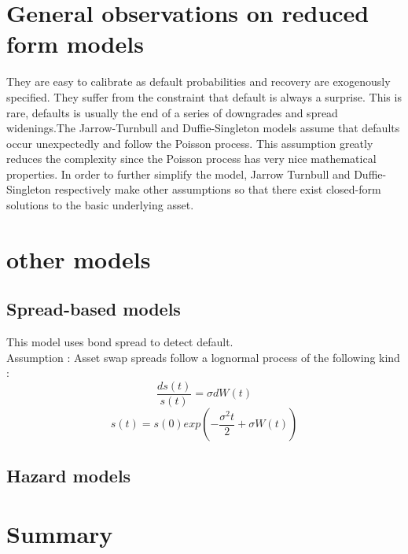 \section{General observations on reduced form models}
They are easy to calibrate as default probabilities and recovery are exogenously specified.
They suffer from the constraint that default is always a surprise. This is rare, defaults is usually the end of a series of downgrades and spread widenings.The Jarrow-Turnbull and Duffie-Singleton models assume that defaults occur unexpectedly and follow the Poisson process. This assumption greatly reduces the complexity since the Poisson process has very nice mathematical properties. In order to further simplify the model, Jarrow Turnbull and Duffie-Singleton respectively make other assumptions so that there exist closed-form solutions to the basic underlying asset.

\section{other models}
\subsection{Spread-based models}
This model uses bond spread to detect default.\\
Assumption : Asset swap spreads follow a lognormal process of the following kind :
\[ \frac{ds(t)}{s(t)}=\sigma dW(t) \]
\[ s(t)=s(0)exp\left( -\frac{\sigma^2 t}{2}+\sigma W(t) \right) \]
\subsection{Hazard models}

\section{Summary}